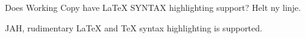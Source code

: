 \documentclass{article}
\begin{document}
\begin{question}
 Does Working Copy have LaTeX SYNTAX highlighting support?
 Helt ny linje.
\end{question}

\begin{answer}
 JAH, rudimentary LaTeX and TeX syntax highlighting is supported.
\end{answer}

\end{document}
